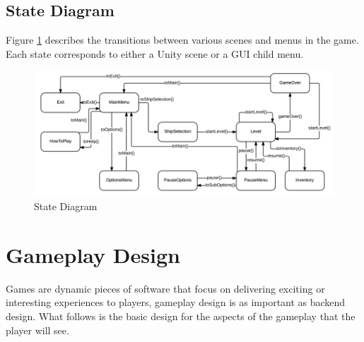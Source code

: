 \documentclass[12pt]{article}       %
\begin{document}
\subsection{State Diagram}
Figure \ref{StateDia} describes the transitions between various scenes and menus in the game. Each state corresponds to either a Unity scene or a GUI child menu.

\begin{figure} [H]
\centering
\includegraphics[width=6.1in]{StateDia.png}
\caption{State Diagram} \label{StateDia}
\end{figure}

\section{Gameplay Design}
\label{sec:GPdesign}

Games are dynamic pieces of software that focus on delivering exciting or interesting experiences to players, gameplay design is as important as backend design. What follows is the basic design for the aspects of the gameplay that the player will see.
\end{document}
